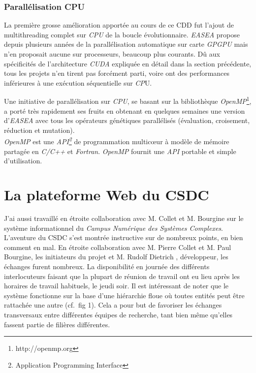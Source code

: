 \documentclass[french, 11pt]{memoir}
\begin{document}
\subsubsection{Parallélisation CPU}\label{paralluxe9lisation-cpu}

La première grosse amélioration apportée au cours de ce CDD fut l'ajout
de multithreading complet sur \textit{CPU} de la boucle évolutionnaire. \textit{EASEA}
propose depuis plusieurs années de la parallélisation automatique sur
carte \textit{GPGPU} mais n'en proposait aucune sur processeurs, beaucoup plus
courants. Dû aux spécificités de l'architecture \textit{CUDA} expliquée en détail
dans la section précédente, tous les projets n'en tirent pas forcément
parti, voire ont des performances inférieures à une exécution
séquentielle sur \textit{CP}U.

\bigskip
Une initiative de parallélisation sur \emph{CPU}, se basant sur la
bibliothèque \textit{OpenMP}\footnote{http://openmp.org}, a porté très rapidement ses fruits en
obtenant en quelques semaines une version d'\textit{EASEA} avec tous les
opérateurs génétiques parallélisés (évaluation, croisement, réduction et
mutation). \\
\emph{OpenMP} est une \emph{API\footnote{Application Programming Interface}} de programmation multicœur à modèle de
mémoire partagée en \textit{C/C++} et \emph{Fortran}. \emph{OpenMP} fournit une
\emph{API} portable et simple d'utilisation.

\section{La plateforme Web du CSDC}\label{la-plateforme-web-du-csdc}

J'ai aussi travaillé en étroite collaboration avec M. Collet et M.
Bourgine sur le système informationnel du \emph{Campus Numérique des
Systèmes Complexes}. \\
L'aventure du CSDC s'est montrée instructive sur de nombreux points, en
bien comment en mal. En étroite collaboration avec M. Pierre Collet et
M. Paul Bourgine, les initiateurs du projet et M. Rudolf Dietrich ,
développeur, les échanges furent nombreux. La disponibilité en journée
des différents interlocuteurs faisant que la plupart de réunion de
travail ont eu lieu après les horaires de travail habituels, le jeudi
soir. Il est intéressant de noter que le système fonctionne sur la base
d'une hiérarchie floue où toutes entités peut être rattachée une autre
(cf.~fig 1). Cela a pour but de favoriser les échanges transversaux
entre différentes équipes de recherche, tant bien même qu'elles fassent
partie de filières différentes.
\end{document}
